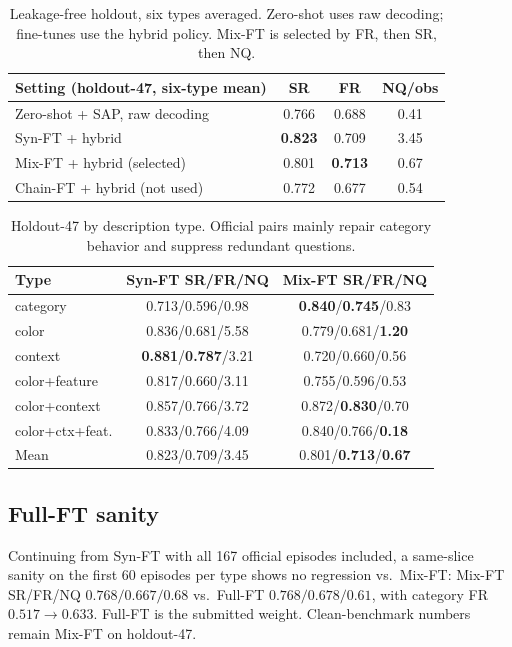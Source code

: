 \documentclass[10pt,a4paper]{article}
\begin{document}
\begin{table}[h]
\centering
\small
\begin{tabular}{lccc}
\toprule
Setting (holdout-47, six-type mean) & SR & FR & NQ/obs \\
\midrule
Zero-shot + SAP, raw decoding & 0.766 & 0.688 & 0.41 \\
Syn-FT + hybrid & \textbf{0.823} & 0.709 & 3.45 \\
Mix-FT + hybrid (selected) & 0.801 & \textbf{0.713} & 0.67 \\
Chain-FT + hybrid (not used) & 0.772 & 0.677 & 0.54 \\
\bottomrule
\end{tabular}
\caption{Leakage-free holdout, six types averaged. Zero-shot uses raw
decoding; fine-tunes use the hybrid policy. Mix-FT is selected by FR,
then SR, then NQ.}
\label{tab:holdout}
\end{table}

\begin{table}[h]
\centering
\small
\begin{tabular}{lcc}
\toprule
Type & Syn-FT SR/FR/NQ & Mix-FT SR/FR/NQ \\
\midrule
category & 0.713/0.596/0.98 & \textbf{0.840}/\textbf{0.745}/0.83 \\
color & 0.836/0.681/5.58 & 0.779/0.681/\textbf{1.20} \\
context & \textbf{0.881}/\textbf{0.787}/3.21 & 0.720/0.660/0.56 \\
color+feature & 0.817/0.660/3.11 & 0.755/0.596/0.53 \\
color+context & 0.857/0.766/3.72 & 0.872/\textbf{0.830}/0.70 \\
color+ctx+feat. & 0.833/0.766/4.09 & 0.840/0.766/\textbf{0.18} \\
\midrule
Mean & 0.823/0.709/3.45 & 0.801/\textbf{0.713}/\textbf{0.67} \\
\bottomrule
\end{tabular}
\caption{Holdout-47 by description type. Official pairs mainly repair
category behavior and suppress redundant questions.}
\label{tab:holdout-type}
\end{table}

\subsection{Full-FT sanity}
Continuing from Syn-FT with all 167 official episodes included, a
same-slice sanity on the first 60 episodes per type shows no
regression vs.\ Mix-FT: Mix-FT SR/FR/NQ $0.768/0.667/0.68$ vs.\
Full-FT $0.768/0.678/0.61$, with category FR $0.517\rightarrow 0.633$.
Full-FT is the submitted weight. Clean-benchmark numbers remain Mix-FT
on holdout-47.
\end{document}
